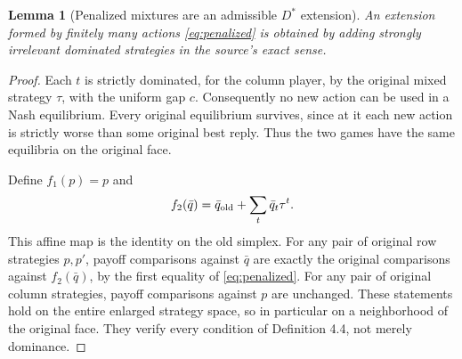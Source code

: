 \documentclass[11pt]{article}
\newtheorem{lemma}[theorem]{Lemma}
\theoremstyle{definition}
\theoremstyle{remark}
\begin{document}
\begin{lemma}[Penalized mixtures are an admissible $D^*$ extension]
\label{lem:dominated}
An extension formed by finitely many actions \eqref{eq:penalized}
is obtained by adding strongly irrelevant dominated strategies in the
source's exact sense.
\end{lemma}
\begin{proof}
Each $t$ is strictly dominated, for the column player, by the original
mixed strategy $\tau$, with the uniform gap $c$. Consequently no new
action can be used in a Nash equilibrium. Every original equilibrium
survives, since at it each new action is strictly worse than some original
best reply. Thus the two games have the same equilibria on the original
face.

Define $f_1(p)=p$ and
\[
 f_2(\bar q)=\bar q_{\rm old}+\sum_t\bar q_t\tau^t.
\]
This affine map is the identity on the old simplex. For any pair of
original row strategies $p,p'$, payoff comparisons against $\bar q$
are exactly the original comparisons against $f_2(\bar q)$, by the
first equality of \eqref{eq:penalized}. For any pair of original column
strategies, payoff comparisons against $p$ are unchanged. These statements
hold on the entire enlarged strategy space, so in particular on a
neighborhood of the original face. They verify every condition of
Definition 4.4, not merely dominance.
\end{proof}
\end{document}
